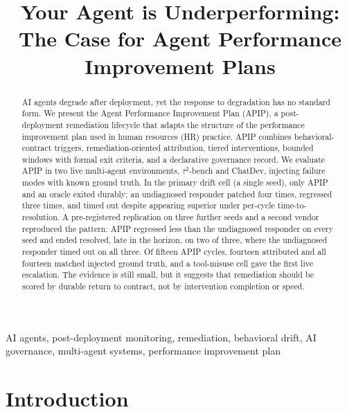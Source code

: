 \documentclass[conference]{IEEEtran}
\begin{document}
\title{Your Agent is Underperforming:\\ The Case for Agent Performance Improvement Plans}

\author{
}

\maketitle

\begin{abstract}
AI agents degrade after deployment, yet the response to degradation has no standard form. We present the Agent Performance Improvement Plan (APIP), a post-deployment remediation lifecycle that adapts the structure of the performance improvement plan used in human resources (HR) practice. APIP combines behavioral-contract triggers, remediation-oriented attribution, tiered interventions, bounded windows with formal exit criteria, and a declarative governance record. We evaluate APIP in two live multi-agent environments, $\tau^2$-bench and ChatDev, injecting failure modes with known ground truth. In the primary drift cell (a single seed), only APIP and an oracle exited durably; an undiagnosed responder patched four times, regressed three times, and timed out despite appearing superior under per-cycle time-to-resolution. A pre-registered replication on three further seeds and a second vendor reproduced the pattern: APIP regressed less than the undiagnosed responder on every seed and ended resolved, late in the horizon, on two of three, where the undiagnosed responder timed out on all three. Of fifteen APIP cycles, fourteen attributed and all fourteen matched injected ground truth, and a tool-misuse cell gave the first live escalation. The evidence is still small, but it suggests that remediation should be scored by durable return to contract, not by intervention completion or speed.
\end{abstract}

\begin{IEEEkeywords}
AI agents, post-deployment monitoring, remediation, behavioral drift, AI governance, multi-agent systems, performance improvement plan
\end{IEEEkeywords}

\section{Introduction}
\end{document}
